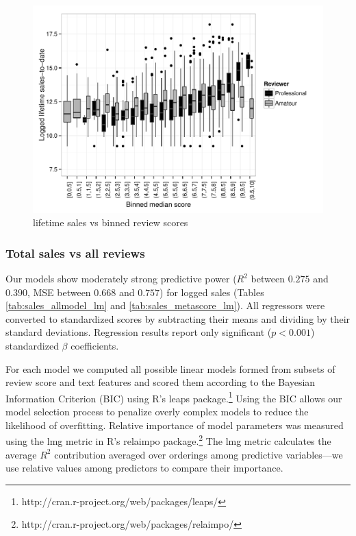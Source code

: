 \documentclass[letterpaper]{article}
\begin{document}
\begin{figure}[tbp]
\centering
\includegraphics[width=\linewidth]{./sales_binnedscore_vs_total}
\caption{lifetime sales vs binned review scores}
\label{fig:lifesale_revscore_boxplot}
\end{figure}

\subsubsection{Total sales vs all reviews}
Our models show moderately strong predictive power ($R^2$ between $0.275$ and $0.390$, MSE between $0.668$ and $0.757$) for logged sales (Tables \ref{tab:sales_allmodel_lm} and \ref{tab:sales_metascore_lm}). All regressors were converted to standardized scores by subtracting their means and dividing by their standard deviations. Regression results report only significant ($p < 0.001$) standardized $\beta$ coefficients.

For each model we computed all possible linear models formed from subsets of review score and text features and scored them according to the Bayesian Information Criterion (BIC) using R's leaps package.\footnote{http://cran.r-project.org/web/packages/leaps/} Using the BIC allows our model selection process to penalize overly complex models to reduce the likelihood of overfitting. Relative importance of model parameters was measured using the lmg metric in R's relaimpo package.\footnote{http://cran.r-project.org/web/packages/relaimpo/} The lmg metric calculates the average $R^2$ contribution averaged over orderings among predictive variables---we use relative values among predictors to compare their importance.
\end{document}
